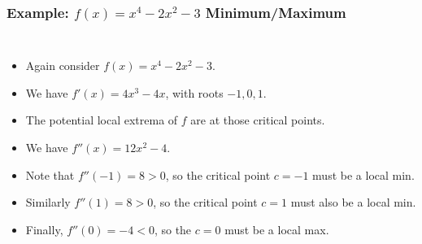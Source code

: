 \documentclass[serif,ignorenonframetext]{beamer}
\begin{document}
\begin{frame}
  \frametitle{Example: $f(x)=x^4-2x^2-3$ Minimum/Maximum}
  \begin{columns}
  \begin{itemize}[<+->]
  \item Again consider $f(x)=x^4-2x^2-3$.
  \item We have $f'(x)=4x^3-4x$, with roots $-1,0,1$.
  \item The potential local extrema of $f$ are at
    those critical points.
  \item We have $f''(x)=12x^2-4$.
  \item Note that $f''(-1)=8>0$, so the critical point
    $c=-1$ must be a local min.
  \item Similarly $f''(1)=8>0$, so the critical point
    $c=1$ must also be a local min.
  \item Finally, $f''(0)=-4<0$, so the $c=0$ must be a local
    max.
  \end{itemize}
  \end{columns}
\end{frame}
\end{document}
